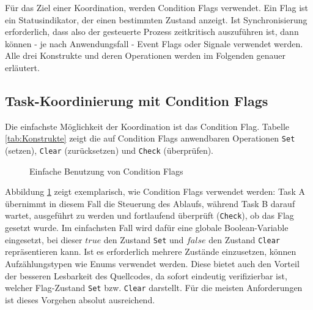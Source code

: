 \documentclass{llncs}
\begin{document}
\begin{table}
	\centering %
	\def\arraystretch{1.5} %
	\setlength{\tabcolsep}{0.5em} %
\caption{\label{tab:Konstrukte} Koordinierungs- und Synchronisationskonstrukte \autocite[vgl.][82]{Cooling2017}}
\end{table}
Für das Ziel einer Koordination, werden Condition Flags verwendet. Ein Flag ist ein Statusindikator, der einen bestimmten Zustand anzeigt. Ist Synchronisierung erforderlich, dass also der gesteuerte Prozess zeitkritisch auszuführen ist, dann können - je nach Anwendungsfall - Event Flags oder Signale verwendet werden. Alle drei Konstrukte und deren Operationen werden im Folgenden genauer erläutert.

\subsection{Task-Koordinierung mit Condition Flags}
\label{subsec:Koordinierung_mit_Condition_Flags}
Die einfachste Möglichkeit der Koordination ist das Condition Flag. Tabelle \ref{tab:Konstrukte} zeigt die auf Condition Flags anwendbaren Operationen \texttt{Set} (setzen), \texttt{Clear} (zurücksetzen) und \texttt{Check} (überprüfen).

\begin{figure}[h]
\centering
\def\svgwidth{300pt}

\caption{\label{fig:ConditionFlag} Einfache Benutzung von Condition Flags \autocite[vgl.][83]{Cooling2017}}
\end{figure}

Abbildung \ref{fig:ConditionFlag} zeigt exemplarisch, wie Condition Flags verwendet werden: Task A übernimmt in diesem Fall die Steuerung des Ablaufs, während Task B darauf wartet, ausgeführt zu werden und fortlaufend überprüft (\texttt{Check}), ob das Flag gesetzt wurde. Im einfachsten Fall wird dafür eine globale Boolean-Variable eingesetzt, bei dieser $true$ den Zustand \texttt{Set} und $false$ den Zustand \texttt{Clear} repräsentieren kann. Ist es erforderlich mehrere Zustände einzusetzen, können Aufzählungstypen wie Enums verwendet werden. Diese bietet auch den Vorteil der besseren Lesbarkeit des Quellcodes, da sofort eindeutig verifizierbar ist, welcher Flag-Zustand \texttt{Set} bzw. \texttt{Clear} darstellt. Für die meisten Anforderungen ist dieses Vorgehen absolut ausreichend. \autocite[vgl.][84]{Cooling2017}\\
\end{document}
